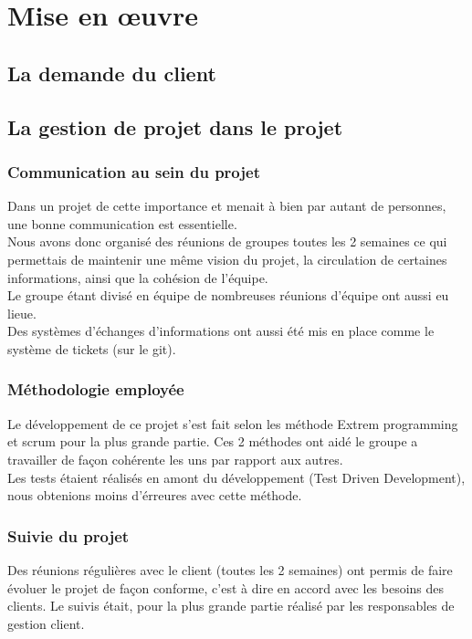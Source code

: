 \chapter{Mise en œuvre}
\section{La demande du client}


\section{La gestion de projet dans le projet}

\subsection{Communication au sein du projet}

Dans un projet de cette importance et menait à bien par autant de personnes, une bonne communication est essentielle.\\
Nous avons donc organisé des réunions de groupes toutes les 2 semaines ce qui permettais de maintenir une même vision du projet, la circulation de certaines informations, ainsi que la cohésion de l'équipe.\\
Le groupe étant divisé en équipe de nombreuses réunions d'équipe ont aussi eu lieue.\\
Des systèmes d'échanges d'informations ont aussi été mis en place comme le système de tickets (sur le git).\\

\subsection{Méthodologie employée}

Le développement de ce projet s'est fait selon les méthode Extrem programming et scrum pour la plus grande partie. Ces 2 méthodes ont aidé le groupe a travailler de façon cohérente les uns par rapport aux autres.\\

Les tests étaient réalisés en amont du développement (Test Driven Development), nous obtenions moins d'érreures avec cette méthode.\\

\subsection{Suivie du projet}
Des réunions régulières avec le client (toutes les 2 semaines) ont permis de faire évoluer le projet de façon conforme, c'est à dire en accord avec les besoins des clients. 
Le suivis était, pour la plus grande partie réalisé par les responsables de gestion client.\\


